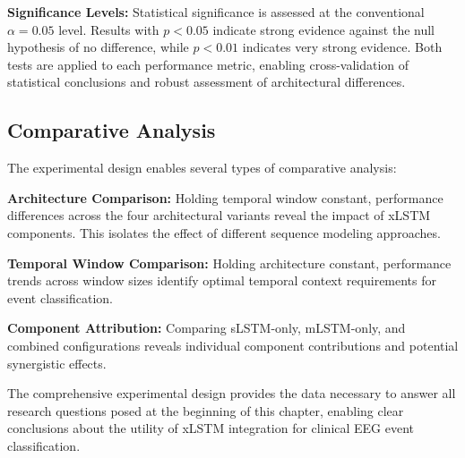 \textbf{Significance Levels:} Statistical significance is assessed at the conventional $\alpha = 0.05$ level. Results with $p < 0.05$ indicate strong evidence against the null hypothesis of no difference, while $p < 0.01$ indicates very strong evidence. Both tests are applied to each performance metric, enabling cross-validation of statistical conclusions and robust assessment of architectural differences.

\subsection{Comparative Analysis}
\label{sec:comparative_analysis}

The experimental design enables several types of comparative analysis:

\textbf{Architecture Comparison:} Holding temporal window constant, performance differences across the four architectural variants reveal the impact of \ac{xLSTM} components. This isolates the effect of different sequence modeling approaches.

\textbf{Temporal Window Comparison:} Holding architecture constant, performance trends across window sizes identify optimal temporal context requirements for event classification.

\textbf{Component Attribution:} Comparing sLSTM-only, mLSTM-only, and combined configurations reveals individual component contributions and potential synergistic effects.

The comprehensive experimental design provides the data necessary to answer all research questions posed at the beginning of this chapter, enabling clear conclusions about the utility of \ac{xLSTM} integration for clinical \ac{EEG} event classification.

